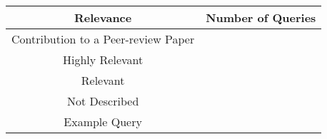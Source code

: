 \begin{center}
    \begin{tabular}{|c|c|}
        Relevance & Number of Queries \\
        \hline
        Contribution to a Peer-review Paper & {} \\
        \hline
        Highly Relevant                     & {} \\
        \hline
        Relevant                            & {} \\
        \hline
        Not Described                       & {} \\
        \hline
        Example Query                       & {} \\
    \end{tabular}
\end{center}
    